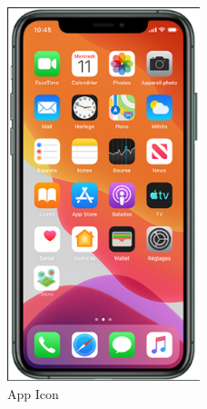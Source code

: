     \begin{figure}[H]
  \centering
  \includegraphics[width=0.5\textwidth,keepaspectratio]{figures/homescreen.png}
  \caption{App Icon}
\end{figure}
